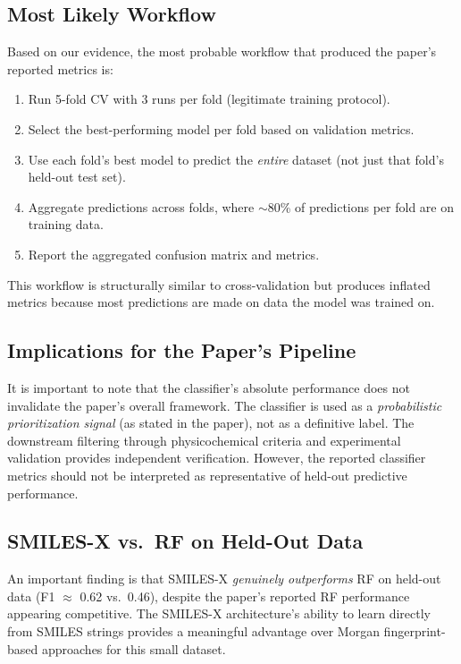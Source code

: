 \documentclass[11pt,a4paper]{article}
\begin{document}
\subsection{Most Likely Workflow}

Based on our evidence, the most probable workflow that produced the paper's reported metrics is:

\begin{enumerate}[nosep]
    \item Run 5-fold CV with 3 runs per fold (legitimate training protocol).
    \item Select the best-performing model per fold based on validation metrics.
    \item Use each fold's best model to predict the \textit{entire} dataset (not just that fold's held-out test set).
    \item Aggregate predictions across folds, where $\sim$80\% of predictions per fold are on training data.
    \item Report the aggregated confusion matrix and metrics.
\end{enumerate}

This workflow is structurally similar to cross-validation but produces inflated metrics because most predictions are made on data the model was trained on.

\subsection{Implications for the Paper's Pipeline}

It is important to note that the classifier's absolute performance does not invalidate the paper's overall framework. The classifier is used as a \textit{probabilistic prioritization signal} (as stated in the paper), not as a definitive label. The downstream filtering through physicochemical criteria and experimental validation provides independent verification. However, the reported classifier metrics should not be interpreted as representative of held-out predictive performance.

\subsection{SMILES-X vs.\ RF on Held-Out Data}

An important finding is that SMILES-X \textit{genuinely outperforms} RF on held-out data (F1 $\approx$ 0.62 vs.\ 0.46), despite the paper's reported RF performance appearing competitive. The SMILES-X architecture's ability to learn directly from SMILES strings provides a meaningful advantage over Morgan fingerprint-based approaches for this small dataset.
\end{document}
